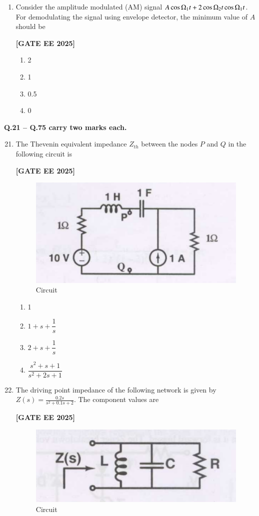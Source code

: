 \documentclass[12pt]{article}
\begin{document}
\begin{enumerate}[leftmargin=2.5em, label=\textbf{Q.\arabic*}., itemsep=2em]
\item Consider the amplitude modulated (AM) signal $A\cos\ohm_1 t+2\cos\ohm_2 t\cos\ohm_1 t$. For demodulating the signal using envelope detector, the minimum value of $A$ should be
 
\noindent \textbf{[GATE EE 2025]}
\begin{enumerate}
  \item 2
  \item 1
  \item 0.5
  \item 0
\end{enumerate}

\end{enumerate}


\large \textbf {Q.21 – Q.75 carry two marks each.}


\begin{enumerate}[leftmargin=*, label=\textbf{Q.\arabic*:}]
\setcounter{enumi}{20}

\item The Thevenin equivalent impedance $Z_{th}$ between the nodes $P$ and $Q$ in the following circuit is
 
\noindent \textbf{[GATE EE 2025]}
\begin{figure}[H]\centering
\includegraphics[width=0.7\columnwidth]{figs/q21.png}
\caption{Circuit}
\label{fig:q21}
\end{figure}
\begin{enumerate}
  \item 1
  \item $1+s+\dfrac{1}{s}$
  \item $2+s+\dfrac{1}{s}$
  \item $\dfrac{s^2+s+1}{s^2+2s+1}$
\end{enumerate}

\item The driving point impedance of the following network is given by $Z(s)=\frac{0.2s}{s^2+0.1s+2}$. The component values are
 
\noindent \textbf{[GATE EE 2025]}
\begin{figure}[H]\centering
\includegraphics[width=0.7\columnwidth]{figs/q22.png}
\caption{Circuit}
\label{fig:q22}
\end{figure}


\end{enumerate}
\end{document}
